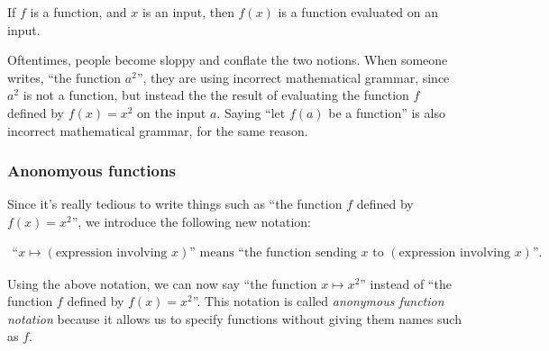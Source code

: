 If $f$ is a function, and $x$ is an input, then $f(x)$ is a function evaluated on an input.

Oftentimes, people become sloppy and conflate the two notions. When someone writes, ``the function $a^2$'', they are using incorrect mathematical grammar, since $a^2$ is not a function, but instead the the result of evaluating the function $f$ defined by $f(x) = x^2$ on the input $a$. Saying ``let $f(a)$ be a function'' is also incorrect mathematical grammar, for the same reason.

\subsubsection*{Anonomyous functions}

Since it's really tedious to write things such as ``the function $f$ defined by $f(x) = x^2$'', we introduce the following new notation:

\begin{align*}
    \text{``}x \mapsto (\text{expression involving $x$}) \text{'' means ``the function sending $x$ to $(\text{expression involving $x$})$''}.
\end{align*}

Using the above notation, we can now say ``the function $x \mapsto x^2$'' instead of ``the function $f$ defined by $f(x) = x^2$''. This notation is called \textit{anonymous function notation} because it allows us to specify functions without giving them names such as $f$.

